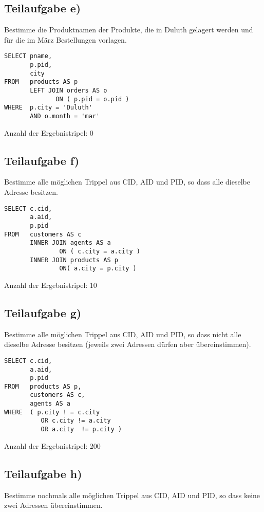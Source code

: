 \subsection{Teilaufgabe e)}
\label{sec:Teilaufgabe e}
Bestimme die Produktnamen der Produkte, die in Duluth gelagert werden und für die im März Bestellungen vorlagen.

\begin{lstlisting}
SELECT pname, 
       p.pid, 
       city 
FROM   products AS p 
       LEFT JOIN orders AS o 
              ON ( p.pid = o.pid ) 
WHERE  p.city = 'Duluth' 
       AND o.month = 'mar' 

\end{lstlisting}
Anzahl der Ergebnistripel: 0


\subsection{Teilaufgabe f)}
\label{sec:Teilaufgabe f}
Bestimme alle möglichen Trippel aus CID, AID und PID, so dass alle dieselbe Adresse besitzen. 

\begin{lstlisting}
SELECT c.cid, 
       a.aid, 
       p.pid 
FROM   customers AS c 
       INNER JOIN agents AS a 
               ON ( c.city = a.city ) 
       INNER JOIN products AS p 
               ON( a.city = p.city ) 
\end{lstlisting}
Anzahl der Ergebnistripel: 10


\subsection{Teilaufgabe g)}
\label{sec:Teilaufgabe g}
Bestimme alle möglichen Trippel aus CID, AID und PID, so dass nicht alle dieselbe Adresse besitzen (jeweils zwei Adressen dürfen aber übereinstimmen). 

\begin{lstlisting}
SELECT c.cid, 
       a.aid, 
       p.pid 
FROM   products AS p, 
       customers AS c, 
       agents AS a 
WHERE  ( p.city ! = c.city 
          OR c.city != a.city 
          OR a.city	 != p.city )  

\end{lstlisting}
Anzahl der Ergebnistripel: 200


\subsection{Teilaufgabe h)}
\label{sec:Teilaufgabe h}
Bestimme nochmals alle möglichen Trippel aus CID, AID und PID, so dass keine zwei Adressen übereinstimmen. 

